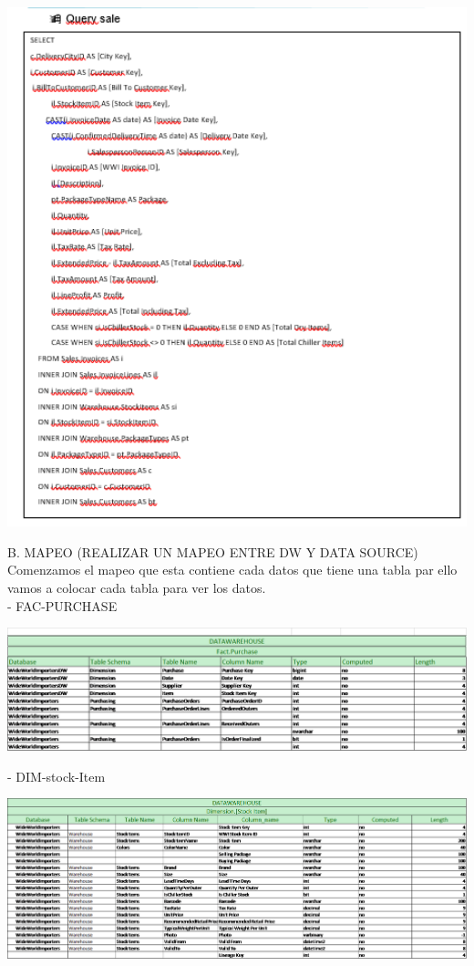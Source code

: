 \documentclass[12pt,letterpaper]{article}
\begin{document}
\begin{center}
\includegraphics[width=17cm]{IMG/19.png} 
\end{center}

B.	MAPEO (REALIZAR UN MAPEO ENTRE DW Y DATA SOURCE) \\
Comenzamos el mapeo que esta contiene cada datos que tiene una tabla par ello vamos a colocar cada tabla para ver los datos.\\

- FAC-PURCHASE\\

\begin{center}
\includegraphics[width=17cm]{IMG/20.png} 
\end{center}
- DIM-stock-Item\\

\begin{center}
\includegraphics[width=17cm]{IMG/21.png} 
\end{center}
\end{document}
